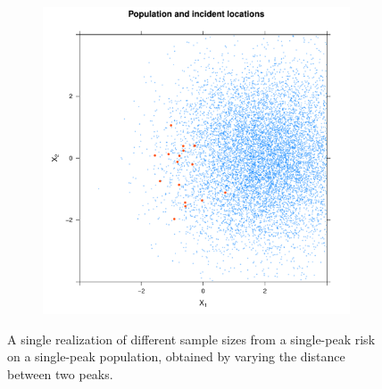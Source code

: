 \begin{figure}[htbp]
\begin{subfigure}{0.45\textwidth}
        \includegraphics[width=\textwidth]{results/p1.4_100_1_1h_4s/output/population_and_incidents_scatter}
        \label{fig:one_sample:p1.4_100_Gap_risk:4}
    \end{subfigure}
    \caption[Examples showing distance between population and incident peaks]
        {A single realization of different sample sizes from a single-peak risk on a single-peak population, obtained by varying the distance between two peaks.}
    \label{fig:one_sample:p1.4_100_Gap_risk}
\end{figure}

